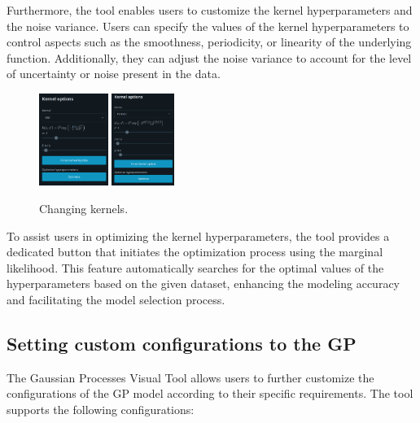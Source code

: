 \documentclass[preprint,journal]{vgtc}       %
\begin{document}
Furthermore, the tool enables users to customize the kernel hyperparameters and the noise variance. Users can specify the values of the kernel hyperparameters to control aspects such as the smoothness, periodicity, or linearity of the underlying function. Additionally, they can adjust the noise variance to account for the level of uncertainty or noise present in the data.


\begin{figure}[H]
  \centering
  \includegraphics[width=0.20\textwidth]{../imgs/kernel-1.png}
  \includegraphics[width=0.18\textwidth]{../imgs/kernel-2.png}
  \caption{Changing kernels.}
\end{figure}

To assist users in optimizing the kernel hyperparameters, the tool provides a dedicated button that initiates the optimization process using the marginal likelihood. This feature automatically searches for the optimal values of the hyperparameters based on the given dataset, enhancing the modeling accuracy and facilitating the model selection process.

\subsection{Setting custom configurations to the GP}

The Gaussian Processes Visual Tool allows users to further customize the configurations of the GP model according to their specific requirements. The tool supports the following configurations:
\end{document}

